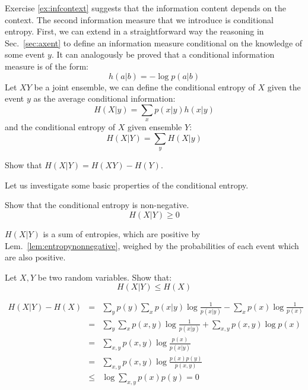 Exercise \ref{ex:infcontext} suggests that the information content depends on the context. The second information measure that we introduce is conditional entropy.
First, we can extend in a straightforward way the reasoning in Sec.~\ref{sec:axent} to define an information measure conditional on the knowledge of some event $y$. 
It can analogously be proved that a conditional information measure is of the form: 
\begin{equation}
h(a|b) = -\log p (a|b)
\end{equation}
Let $XY$ be a joint ensemble, we can define the conditional entropy of $X$ given the event $y$ as the average conditional information:
\begin{equation}
H({X}|y) = \sum_x p(x|y) h(x|y)
\end{equation}
and the conditional entropy of $X$ given ensemble $Y$:
\begin{equation}
H({X}|{Y})=\sum_yH(X|y)
\end{equation}
\begin{exercise}
Show that $H(X|Y)=H(XY)-H(Y)$.
\end{exercise}
Let us investigate some basic properties of the conditional entropy.
\begin{exercise}Show that the conditional entropy is non-negative.
\begin{equation*}
H({X}|{Y}) \geq 0
\end{equation*}
\end{exercise}
\begin{solution}
$H({X}|{Y})$ is a sum of entropies, which are positive by Lem.~\ref{lem:entropynonnegative}, weighed by the probabilities of each event which are also positive.
\end{solution}

\begin{exercise}
\label{lem:entgeqcond}
Let $X,Y$ be two random variables. Show that:
\begin{equation*}
H({X}|{Y}) \leq H({X})
\end{equation*}
\end{exercise}
\begin{solution}
\begin{eqnarray}
H({X}|{Y}) - H({X}) &=& \sum_{y }p(y) \sum_{x} p(x|y)\log \frac{1}{p(x|y)} - \sum_{x}p(x) \log  \frac{1}{p(x)}\nonumber \\
                         &=& \sum_{y}\sum_{x}p(x,y) \log \frac{1}{p(x|y)} + \sum_{x,y}p(x,y) \log  p(x) \nonumber \\
                         &=& \sum_{x,y}p(x,y) \log  \frac{p(x)}{p(x|y)} \nonumber \\
                         &=& \sum_{x,y}p(x,y) \log  \frac{p(x)p(y)}{p(x,y)} \nonumber \\
                         &\leq & \log \sum_{x,y} p(x) p(y) = 0
\end{eqnarray}
\end{solution}

